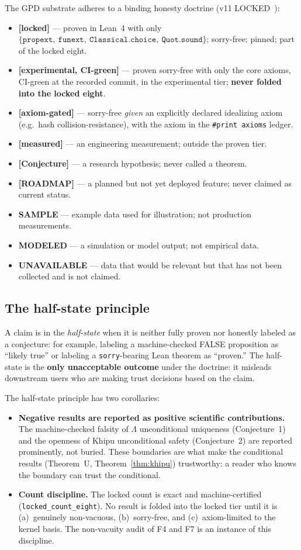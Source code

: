 \documentclass[11pt,letterpaper]{article}
\theoremstyle{definition}
\newcommand{\Lam}{\Lambda}
\newcommand{\kernelaxioms}%
  {\{\texttt{propext},\allowbreak\ \texttt{funext},\allowbreak\ \texttt{Classical.choice},\allowbreak\ \texttt{Quot.sound}\}}
\newcommand{\locked}{\textbf{[locked]}}
\newcommand{\experimental}{\textbf{[experimental, CI-green]}}
\newcommand{\conj}{\textbf{[Conjecture]}}
\newcommand{\measured}{\textbf{[measured]}}
\newcommand{\roadmap}{\textbf{[ROADMAP]}}
\newcommand{\axiomgated}{\textbf{[axiom-gated]}}
\begin{document}
The GPD substrate adheres to a binding honesty doctrine (v11 LOCKED~\cite{szl_concept}):

\begin{itemize}
\item \locked{} --- proven in Lean~4 with only $\kernelaxioms$; sorry-free;
  pinned; part of the locked eight.
\item \experimental{} --- proven sorry-free with only the core axioms, CI-green
  at the recorded commit, in the experimental tier; \textbf{never folded into the
  locked eight}.
\item \axiomgated{} --- sorry-free \emph{given} an explicitly declared idealizing
  axiom (e.g.\ hash collision-resistance), with the axiom in the
  \texttt{\#print axioms} ledger.
\item \measured{} --- an engineering measurement; outside the proven tier.
\item \conj{} --- a research hypothesis; never called a theorem.
\item \roadmap{} --- a planned but not yet deployed feature; never claimed as
  current status.
\item \textbf{SAMPLE} --- example data used for illustration; not production
  measurements.
\item \textbf{MODELED} --- a simulation or model output; not empirical data.
\item \textbf{UNAVAILABLE} --- data that would be relevant but that has not been
  collected and is not claimed.
\end{itemize}

\subsection{The half-state principle}

A claim is in the \emph{half-state} when it is neither fully proven nor honestly
labeled as a conjecture: for example, labeling a machine-checked FALSE proposition
as ``likely true'' or labeling a \texttt{sorry}-bearing Lean theorem as ``proven.''
The half-state is the \textbf{only unacceptable outcome} under the doctrine: it
misleads downstream users who are making trust decisions based on the claim.

The half-state principle has two corollaries:
\begin{itemize}
\item \textbf{Negative results are reported as positive scientific contributions.}
  The machine-checked falsity of $\Lam$ unconditional uniqueness
  (Conjecture~1) and the openness of Khipu unconditional safety (Conjecture~2)
  are reported prominently, not buried.  These boundaries are what make the
  conditional results (Theorem~U, Theorem~\ref{thm:khipu}) trustworthy: a reader
  who knows the boundary can trust the conditional.
\item \textbf{Count discipline.}  The locked count is exact and machine-certified
  (\texttt{locked\_count\_eight}).  No result is folded into the locked tier until
  it is (a)~genuinely non-vacuous, (b)~sorry-free, and (c)~axiom-limited to the
  kernel basis.  The non-vacuity audit of F4 and F7 is an instance of this
  discipline.
\end{itemize}
\end{document}
